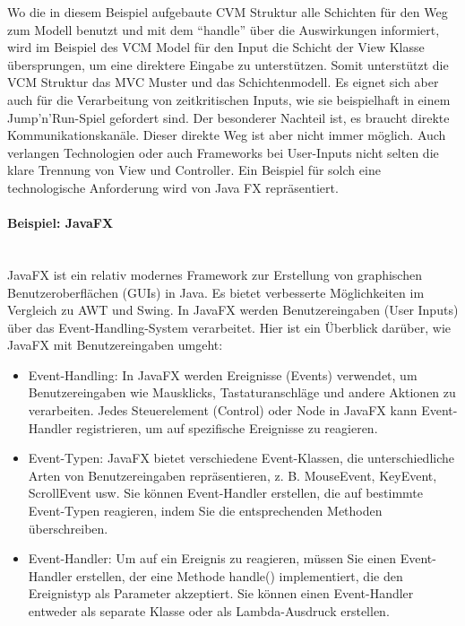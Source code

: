 \documentclass[../vs-script-first-v01.tex]{subfiles}
\begin{document}
Wo die in diesem Beispiel aufgebaute CVM Struktur alle Schichten für den Weg zum Modell benutzt und mit dem \enquote{handle} über die Auswirkungen informiert, wird im Beispiel des VCM Model für den Input die Schicht der View Klasse übersprungen, um eine direktere Eingabe zu unterstützen. Somit unterstützt die VCM Struktur das MVC Muster und das Schichtenmodell. Es eignet  sich aber auch für die Verarbeitung von zeitkritischen Inputs, wie sie beispielhaft in einem Jump'n'Run-Spiel gefordert sind. Der besonderer Nachteil ist, es braucht direkte Kommunikationskanäle. Dieser direkte Weg ist aber nicht immer möglich. Auch verlangen Technologien oder auch Frameworks bei User-Inputs nicht selten die klare Trennung von View und Controller. Ein Beispiel für solch eine technologische Anforderung wird von Java FX repräsentiert.     

\paragraph{Beispiel: JavaFX\\\\}
JavaFX ist ein relativ modernes Framework zur Erstellung von graphischen Benutzeroberflächen (GUIs) in Java. Es bietet verbesserte Möglichkeiten im Vergleich zu AWT und Swing. In JavaFX werden Benutzereingaben (User Inputs) über das Event-Handling-System verarbeitet. Hier ist ein Überblick darüber, wie JavaFX mit Benutzereingaben umgeht:
\begin{itemize}
\item Event-Handling: In JavaFX werden Ereignisse (Events) verwendet, um Benutzereingaben wie Mausklicks, Tastaturanschläge und andere Aktionen zu verarbeiten. Jedes Steuerelement (Control) oder Node in JavaFX kann Event-Handler registrieren, um auf spezifische Ereignisse zu reagieren.
\item Event-Typen: JavaFX bietet verschiedene Event-Klassen, die unterschiedliche Arten von Benutzereingaben repräsentieren, z. B. MouseEvent, KeyEvent, ScrollEvent usw. Sie können Event-Handler erstellen, die auf bestimmte Event-Typen reagieren, indem Sie die entsprechenden Methoden überschreiben.
\item Event-Handler: Um auf ein Ereignis zu reagieren, müssen Sie einen Event-Handler erstellen, der eine Methode handle() implementiert, die den Ereignistyp als Parameter akzeptiert. Sie können einen Event-Handler entweder als separate Klasse oder als Lambda-Ausdruck erstellen.
 \end{itemize}   
\end{document}
